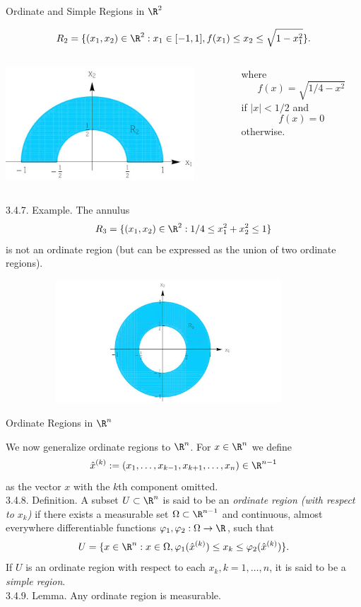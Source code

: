 \documentclass[smaller,hyperref={CJKbookmarks=true}]{beamer}
\begin{document}
\begin{frame}{Ordinate and Simple Regions in $\R^2$}
\begin{spacing}{1}
\[R_2=\{(x_1,x_2)\in\R^2:x_1\in[-1,1],f(x_1)\leq
x_2\leq\sqrt{1-x_1^2}\}.\]
\vspace*{-11pt}
\begin{columns}[onlytextwidth]
\begin{column}{0.65\textwidth}
\includegraphics[width=\columnwidth,height=120pt]{91.jpg}
\end{column}
\begin{column}{0.35\textwidth}
where
\[f(x)=\sqrt{1/4-x^2}\]
if $|x|<1/2$ and
\[f(x)=0\]
otherwise.
\end{column}
\end{columns}
\newpage
\alert{3.4.7. Example.} The annulus
\[R_3=\{(x_1,x_2)\in\R^2:1/4\leq x_1^2+x_2^2\leq1\}\]
is not an ordinate region (but can be expressed as the union of two ordinate regions).
\vspace*{-8pt}
\begin{figure}
  \centering
  \includegraphics[width=0.9\textwidth,height=130pt]{71.jpg}

\end{figure}
\end{spacing}
\end{frame}
\begin{frame}[t]{Ordinate Regions in $\R^n$}
\begin{spacing}{1.05}
We now generalize ordinate regions to $\R^n$. For $x\in\R^n$ we define
\[\hat{x}^{(k)}:=(x_1,\ldots,x_{k-1},x_{k+1},\ldots,
x_n)\in\R^{n-1}\]
as the vector $x$ with the $k$th component omitted.\\[4pt]
\alert{3.4.8. Definition.} A subset $U\subset\R^n$ is said to be an \emph{ordinate region (with respect to $x_k$)} if there exists a measurable set $\Omega\subset\R^{n-1}$ and continuous, almost everywhere dif{}ferentiable functions $\varphi_1,\varphi_2:\Omega\to\R$, such that
\[U=\{x\in\R^n:x\in\Omega,\varphi_1(\hat{x}^{(k)})\leq
x_k\leq\varphi_2(\hat{x}^{(k)})\}.\]
If $U$ is an ordinate region with respect to each $x_k,k=1,\ldots,n$, it is said to be a \emph{simple region}.\\[6pt]
\alert{3.4.9. Lemma.} Any ordinate region is measurable.
\end{spacing}
\end{frame}
\end{document}
